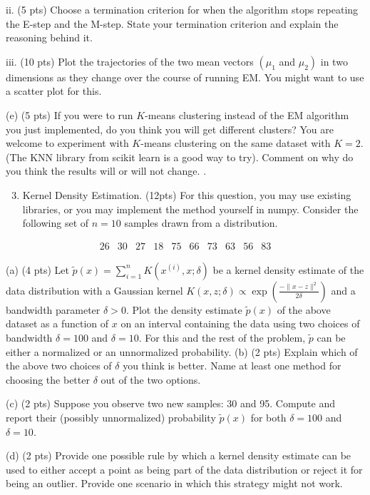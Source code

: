 \documentclass[10pt]{article}
\begin{document}
ii. (5 pts) Choose a termination criterion for when the algorithm stops repeating the E-step and the M-step. State your termination criterion and explain the reasoning behind it.

iii. (10 pts) Plot the trajectories of the two mean vectors $\left(\mu_{1}\right.$ and $\left.\mu_{2}\right)$ in two dimensions as they change over the course of running EM. You might want to use a scatter plot for this.

(e) (5 pts) If you were to run $K$-means clustering instead of the EM algorithm you just implemented, do you think you will get different clusters? You are welcome to experiment with $K$-means clustering on the same dataset with $K=2$. (The KNN library from scikit learn is a good way to try). Comment on why do you think the results will or will not change. .

\begin{enumerate}
  \setcounter{enumi}{2}
  \item Kernel Density Estimation. (12pts) For this question, you may use existing libraries, or you may implement the method yourself in numpy. Consider the following set of $n=10$ samples drawn from a distribution.
\end{enumerate}

$$
\begin{array}{llllllllll}
26 & 30 & 27 & 18 & 75 & 66 & 73 & 63 & 56 & 83
\end{array}
$$

(a) (4 pts) Let $\tilde{p}(x)=\sum_{i=1}^{n} K\left(x^{(i)}, x ; \delta\right)$ be a kernel density estimate of the data distribution with a Gaussian kernel $K(x, z ; \delta) \propto \exp \left(\frac{-\|x-z\|^{2}}{2 \delta}\right)$ and a bandwidth parameter $\delta>0$. Plot the density estimate $\tilde{p}(x)$ of the above dataset as a function of $x$ on an interval containing the data using two choices of bandwidth $\delta=100$ and $\delta=10$. For this and the rest of the problem, $\tilde{p}$ can be either a normalized or an unnormalized probability. (b) (2 pts) Explain which of the above two choices of $\delta$ you think is better. Name at least one method for choosing the better $\delta$ out of the two options.

(c) (2 pts) Suppose you observe two new samples: 30 and 95. Compute and report their (possibly unnormalized) probability $\tilde{p}(x)$ for both $\delta=100$ and $\delta=10$.

(d) (2 pts) Provide one possible rule by which a kernel density estimate can be used to either accept a point as being part of the data distribution or reject it for being an outlier. Provide one scenario in which this strategy might not work.
\end{document}
